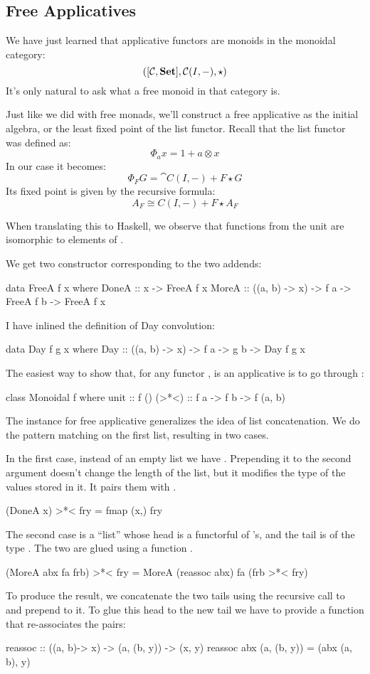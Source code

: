 \documentclass[DaoFP]{subfiles}
\begin{document}
\subsection{Free Applicatives}

We have just learned that applicative functors are monoids in the monoidal category:
\[ ([\mathcal{C}, \mathbf{Set}], \mathcal{C}(I, -), \star) \]
It's only natural to ask what a free monoid in that category is. 

Just like we did with free monads, we'll construct a free applicative as the initial algebra, or the least fixed point of the list functor. Recall that the list functor was defined as:
\[ \Phi_a x = 1 + a \otimes x \]
In our case it becomes:
\[ \Phi_F G = \cat C(I, -) + F \star G \]
Its fixed point is given by the recursive formula:
\[ A_F \cong C(I, -) + F \star A_F\]

When translating this to Haskell, we observe that functions from the unit  are isomorphic to elements of . 

We get two constructor corresponding to the two addends:
\begin{haskell}
data FreeA f x where
  DoneA :: x -> FreeA f x
  MoreA :: ((a, b) -> x) -> f a -> FreeA f b -> FreeA f x
\end{haskell}
I have inlined the definition of Day convolution:
\begin{haskell}
data Day f g x where
  Day :: ((a, b) -> x) -> f a -> g b -> Day f g x
\end{haskell}

The easiest way to show that, for any functor ,  is an applicative is to go through :
\begin{haskell}
class Monoidal f where
  unit  :: f ()
  (>*<) :: f a -> f b -> f (a, b)
\end{haskell}

The  instance for free applicative generalizes the idea of list concatenation. We do the pattern matching on the first list, resulting in two cases.

In the first case, instead of an empty list we have . Prepending it to the second argument doesn't change the length of the list, but it modifies the type of the values stored in it. It pairs them with .
\begin{haskell}
  (DoneA x) >*< fry = fmap (x,) fry
\end{haskell}

The second case is a ``list'' whose head  is a functorful of 's, and the tail  is of the type . The two are glued using a function . 
\begin{haskell}
  (MoreA abx fa frb) >*< fry = MoreA (reassoc abx) fa (frb >*< fry)
\end{haskell}
To produce the result, we concatenate the two tails using the recursive call to \hask{>*<} and prepend  to it. To glue this head to the new tail we have to provide a function that re-associates the pairs:
\begin{haskell}
reassoc :: ((a, b)-> x) -> (a, (b, y)) -> (x, y)
reassoc abx (a, (b, y)) = (abx (a, b), y)
\end{haskell}
\end{document}
